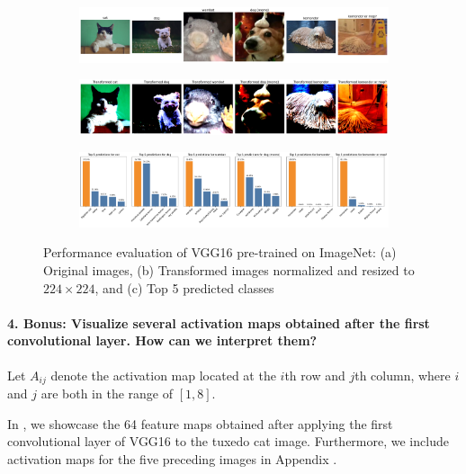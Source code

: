 \begin{figure}[H]
    \centering
    \begin{subfigure}{0.95\textwidth}
        \includegraphics[width=\textwidth]{original_images}
        \caption{}
        \label{subfig:original_images}
    \end{subfigure}
    \begin{subfigure}{0.95\textwidth}
        \includegraphics[width=\textwidth]{transformed_images}
        \caption{}
        \label{subfig:transformed_images}
    \end{subfigure}
    \begin{subfigure}{0.95\textwidth}
        \includegraphics[width=\textwidth]{prediction_plots}
        \caption{}
        \label{subfig:prediction_plots}
    \end{subfigure}
    \caption{Performance evaluation of VGG16 pre-trained on ImageNet: (a) Original images, (b) Transformed images normalized and resized to $224 \times 224$, and (c) Top 5 predicted classes}
    \label{fig:vgg16}
\end{figure}


\paragraph{4. \textbf{Bonus}: Visualize several activation maps obtained after the first convolutional layer. How can we interpret them?}
Let $A_{ij}$ denote the activation map located at the $i$th row and $j$th column, where $i$ and $j$ are both in the range of $[1, 8]$.

In , we showcase the 64 feature maps obtained after applying the first convolutional layer of VGG16 to the tuxedo cat image. Furthermore, we include activation maps for the five preceding images in Appendix .

